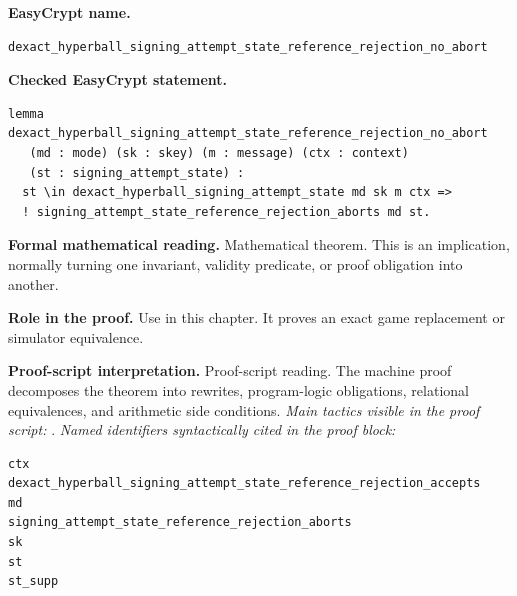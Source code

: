 \begin{formaltheorem}
\noindent\textbf{EasyCrypt name.}
\begin{lstlisting}[language=EasyCrypt,basicstyle=\ttfamily\scriptsize]
dexact_hyperball_signing_attempt_state_reference_rejection_no_abort
\end{lstlisting}
\noindent\textbf{Checked EasyCrypt statement.}
\begin{lstlisting}[language=EasyCrypt,basicstyle=\ttfamily\scriptsize]
lemma dexact_hyperball_signing_attempt_state_reference_rejection_no_abort
   (md : mode) (sk : skey) (m : message) (ctx : context)
   (st : signing_attempt_state) :
  st \in dexact_hyperball_signing_attempt_state md sk m ctx =>
  ! signing_attempt_state_reference_rejection_aborts md st.
\end{lstlisting}
\noindent\textbf{Formal mathematical reading.}
Mathematical theorem. This is an implication, normally turning one invariant, validity predicate, or proof obligation into another.

\noindent\textbf{Role in the proof.}
Use in this chapter. It proves an exact game replacement or simulator equivalence.

\noindent\textbf{Proof-script interpretation.}
Proof-script reading. The machine proof decomposes the theorem into rewrites, program-logic obligations, relational equivalences, and arithmetic side conditions.
\emph{Main tactics visible in the proof script:} .
\emph{Named identifiers syntactically cited in the proof block:}
\begin{lstlisting}[language=EasyCrypt,basicstyle=\ttfamily\scriptsize]
ctx
dexact_hyperball_signing_attempt_state_reference_rejection_accepts
md
signing_attempt_state_reference_rejection_aborts
sk
st
st_supp
\end{lstlisting}

\end{formaltheorem}

